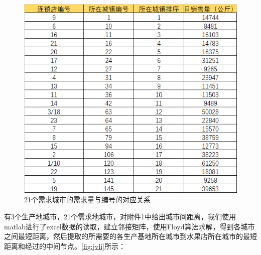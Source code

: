 \documentclass{article}
\begin{document}
	 \begin{figure}[H]
	 	\centering
	 	\includegraphics[width=0.8\linewidth]{img/xiaoliang.png}
	 	\caption{21个需求城市的需求量与编号的对应关系}
	 	\label{fig:xiaoliang}
	 \end{figure}
	 
	 有3个生产地城市，21个需求地城市，对附件1中给出城市间距离，我们使用matlab进行了excel数据的读取，建立邻接矩阵，使用Floyd算法求解，得到各城市之间最短距离，然后提取的所需要的各生产基地所在城市到水果店所在城市的最短距离和经过的中间节点。\ref{fig:jvli}所示：
	 
\end{document}
